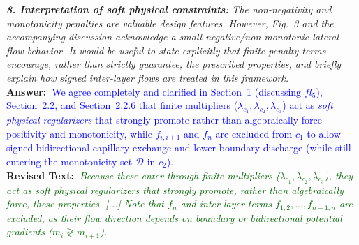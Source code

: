 \documentclass[10pt]{article}
\newcommand{\query}[2][]{\ifthenelse{\equal{#1}{}}{}{\textbf{#1:}~}\emph{#2}}
\newcommand{\ans}[1]{\textbf{Answer:~}#1}
\newcommand{\Rtext}[1]{\textbf{Revised Text:~}#1}
\begin{document}
\query[R-2.8]{\textbf{8. Interpretation of soft physical constraints:} The non-negativity and monotonicity penalties are valuable design features. However, Fig.~3 and the accompanying discussion acknowledge a small negative/non-monotonic lateral-flow behavior. It would be useful to state explicitly that finite penalty terms encourage, rather than strictly guarantee, the prescribed properties, and briefly explain how signed inter-layer flows are treated in this framework.}\\
\ans{\textcolor{blue}{We agree completely and clarified in Section~1 (discussing $fl_5$), Section~2.2, and Section~2.2.6 that finite multipliers ($\lambda_{c_1}, \lambda_{c_2}, \lambda_{c_3}$) act as \emph{soft physical regularizers} that strongly promote rather than algebraically force positivity and monotonicity, while $f_{i,i+1}$ and $f_n$ are excluded from $c_1$ to allow signed bidirectional capillary exchange and lower-boundary discharge (while still entering the monotonicity set $\mathcal{D}$ in $c_2$).}}\\
\Rtext{\emph{\textcolor{darkgreen}{Because these enter through finite multipliers ($\lambda_{c_1}, \lambda_{c_2}, \lambda_{c_3}$), they act as \emph{soft physical regularizers} that strongly promote, rather than algebraically force, these properties. [...] Note that $f_n$ and inter-layer terms $f_{1,2},\dots,f_{n-1,n}$ are excluded, as their flow direction depends on boundary or bidirectional potential gradients ($m_i \gtrless m_{i+1}$).}}}
\end{document}
